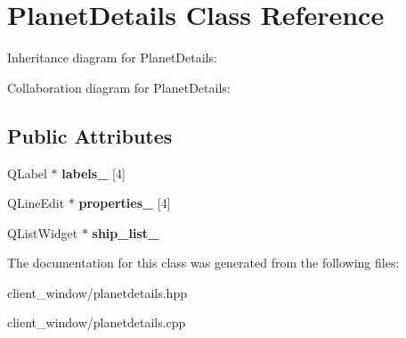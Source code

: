 \hypertarget{classPlanetDetails}{}\section{Planet\+Details Class Reference}
\label{classPlanetDetails}


Inheritance diagram for Planet\+Details\+:


Collaboration diagram for Planet\+Details\+:
\subsection*{Public Attributes}
\begin{DoxyCompactItemize}
\item 
Q\+Label $\ast$ {\bfseries labels\+\_\+} \mbox{[}4\mbox{]}\hypertarget{classPlanetDetails_a6ec2dd5267f08b3420a06b57a0f38945}{}\label{classPlanetDetails_a6ec2dd5267f08b3420a06b57a0f38945}

\item 
Q\+Line\+Edit $\ast$ {\bfseries properties\+\_\+} \mbox{[}4\mbox{]}\hypertarget{classPlanetDetails_aaaa3aa4f674a526fc7dd577230d79cb7}{}\label{classPlanetDetails_aaaa3aa4f674a526fc7dd577230d79cb7}

\item 
Q\+List\+Widget $\ast$ {\bfseries ship\+\_\+list\+\_\+}\hypertarget{classPlanetDetails_a1c1c411c0e57ced10c510b395c907ca2}{}\label{classPlanetDetails_a1c1c411c0e57ced10c510b395c907ca2}

\end{DoxyCompactItemize}


The documentation for this class was generated from the following files\+:\begin{DoxyCompactItemize}
\item 
client\+\_\+window/planetdetails.\+hpp\item 
client\+\_\+window/planetdetails.\+cpp\end{DoxyCompactItemize}
